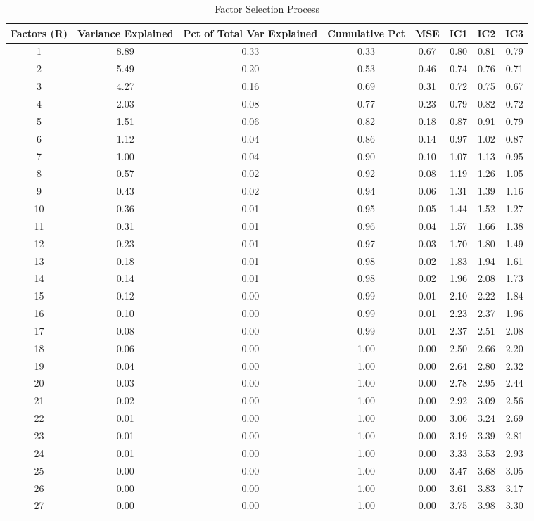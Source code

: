 \documentclass[11pt, letterpaper]{article}\usepackage[]{graphicx}\usepackage[]{color}
\begin{document}
\begin{table}[H]
\centering
\begingroup\scriptsize
\begin{tabular}{cccccccc}
  \hline
Factors (R) & Variance Explained & Pct of Total Var Explained & Cumulative Pct & MSE & IC1 & IC2 & IC3 \\ 
  \hline
  1 & 8.89 & 0.33 & 0.33 & 0.67 & 0.80 & 0.81 & 0.79 \\ 
    2 & 5.49 & 0.20 & 0.53 & 0.46 & 0.74 & 0.76 & 0.71 \\ 
    3 & 4.27 & 0.16 & 0.69 & 0.31 & 0.72 & 0.75 & 0.67 \\ 
    4 & 2.03 & 0.08 & 0.77 & 0.23 & 0.79 & 0.82 & 0.72 \\ 
    5 & 1.51 & 0.06 & 0.82 & 0.18 & 0.87 & 0.91 & 0.79 \\ 
    6 & 1.12 & 0.04 & 0.86 & 0.14 & 0.97 & 1.02 & 0.87 \\ 
    7 & 1.00 & 0.04 & 0.90 & 0.10 & 1.07 & 1.13 & 0.95 \\ 
    8 & 0.57 & 0.02 & 0.92 & 0.08 & 1.19 & 1.26 & 1.05 \\ 
    9 & 0.43 & 0.02 & 0.94 & 0.06 & 1.31 & 1.39 & 1.16 \\ 
   10 & 0.36 & 0.01 & 0.95 & 0.05 & 1.44 & 1.52 & 1.27 \\ 
   11 & 0.31 & 0.01 & 0.96 & 0.04 & 1.57 & 1.66 & 1.38 \\ 
   12 & 0.23 & 0.01 & 0.97 & 0.03 & 1.70 & 1.80 & 1.49 \\ 
   13 & 0.18 & 0.01 & 0.98 & 0.02 & 1.83 & 1.94 & 1.61 \\ 
   14 & 0.14 & 0.01 & 0.98 & 0.02 & 1.96 & 2.08 & 1.73 \\ 
   15 & 0.12 & 0.00 & 0.99 & 0.01 & 2.10 & 2.22 & 1.84 \\ 
   16 & 0.10 & 0.00 & 0.99 & 0.01 & 2.23 & 2.37 & 1.96 \\ 
   17 & 0.08 & 0.00 & 0.99 & 0.01 & 2.37 & 2.51 & 2.08 \\ 
   18 & 0.06 & 0.00 & 1.00 & 0.00 & 2.50 & 2.66 & 2.20 \\ 
   19 & 0.04 & 0.00 & 1.00 & 0.00 & 2.64 & 2.80 & 2.32 \\ 
   20 & 0.03 & 0.00 & 1.00 & 0.00 & 2.78 & 2.95 & 2.44 \\ 
   21 & 0.02 & 0.00 & 1.00 & 0.00 & 2.92 & 3.09 & 2.56 \\ 
   22 & 0.01 & 0.00 & 1.00 & 0.00 & 3.06 & 3.24 & 2.69 \\ 
   23 & 0.01 & 0.00 & 1.00 & 0.00 & 3.19 & 3.39 & 2.81 \\ 
   24 & 0.01 & 0.00 & 1.00 & 0.00 & 3.33 & 3.53 & 2.93 \\ 
   25 & 0.00 & 0.00 & 1.00 & 0.00 & 3.47 & 3.68 & 3.05 \\ 
   26 & 0.00 & 0.00 & 1.00 & 0.00 & 3.61 & 3.83 & 3.17 \\ 
   27 & 0.00 & 0.00 & 1.00 & 0.00 & 3.75 & 3.98 & 3.30 \\ 
   \hline
\end{tabular}
\endgroup
\caption{Factor Selection Process} 
\end{table}
\end{document}
